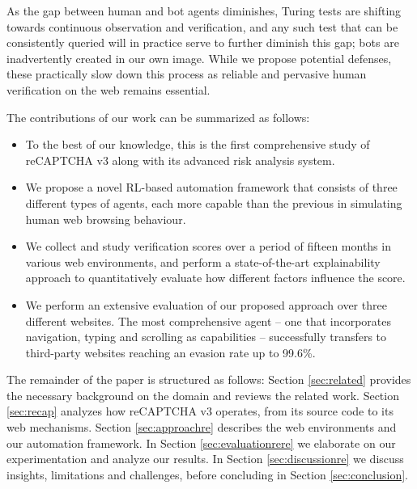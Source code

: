 As the gap between human and bot agents diminishes, Turing tests are shifting towards continuous observation and verification, and any such test that can be consistently queried will in practice serve to further diminish this gap; bots are inadvertently created in our own image.
While we propose potential defenses, these practically slow down this process as reliable and pervasive human verification on the web remains essential.

The contributions of our work can be summarized as follows:
\begin{itemize}
\item To the best of our knowledge, this is the first comprehensive study of reCAPTCHA v3 along with its advanced risk analysis system.

\item We propose a novel RL-based automation framework that consists of three different types of agents, each more capable than the previous in simulating human web browsing behaviour.


\item We collect and study verification scores over a period of fifteen months in various web environments, and perform a state-of-the-art explainability approach to quantitatively evaluate how different factors influence the score.

\item We perform an extensive evaluation of our proposed approach over three different websites.
The most comprehensive agent -- one that incorporates navigation, typing and scrolling as capabilities -- successfully transfers to third-party websites reaching an evasion rate up to 99.6\%.
\end{itemize}

The remainder of the paper is structured as follows:
Section \ref{sec:related} provides the necessary background on the domain and reviews the related work.
Section \ref{sec:recap} analyzes how reCAPTCHA v3 operates, from its source code to its web mechanisms.
Section \ref{sec:approachre} describes the web environments and our automation framework.
In Section \ref{sec:evaluationrere} we elaborate on our experimentation and analyze our results.
In Section \ref{sec:discussionre} we discuss insights, limitations and challenges, before concluding in Section \ref{sec:conclusion}.

